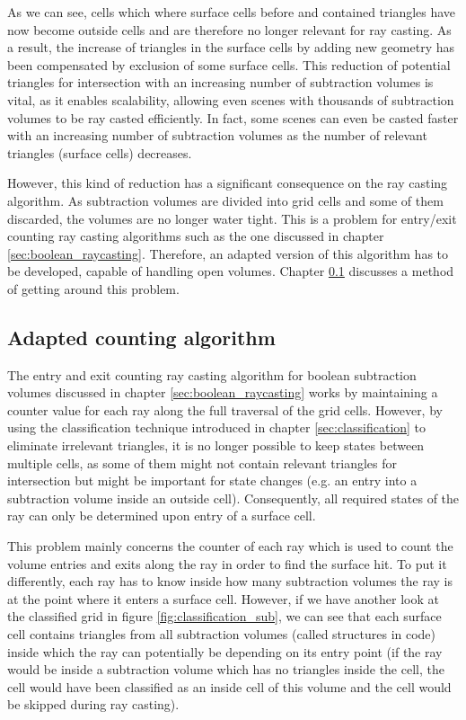 As we can see, cells which where surface cells before and contained triangles have now become outside cells and are therefore no longer relevant for ray casting. As a result, the increase of triangles in the surface cells by adding new geometry has been compensated by exclusion of some surface cells. This reduction of potential triangles for intersection with an increasing number of subtraction volumes is vital, as it enables scalability, allowing even scenes with thousands of subtraction volumes to be ray casted efficiently. In fact, some scenes can even be casted faster with an increasing number of subtraction volumes as the number of relevant triangles (surface cells) decreases.

However, this kind of reduction has a significant consequence on the ray casting algorithm. As subtraction volumes are divided into grid cells and some of them discarded, the volumes are no longer water tight. This is a problem for entry/exit counting ray casting algorithms such as the one discussed in chapter \ref{sec:boolean_raycasting}. Therefore, an adapted version of this algorithm has to be developed, capable of handling open volumes. Chapter \ref{sec:adapted_ray_casting} discusses a method of getting around this problem.


\subsection{Adapted counting algorithm}
\label{sec:adapted_ray_casting}

The entry and exit counting ray casting algorithm for boolean subtraction volumes discussed in chapter \ref{sec:boolean_raycasting} works by maintaining a counter value for each ray along the full traversal of the grid cells. However, by using the  classification technique introduced in chapter \ref{sec:classification} to eliminate irrelevant triangles, it is no longer possible to keep states between multiple cells, as some of them might not contain relevant triangles for intersection but might be important for state changes (e.g. an entry into a subtraction volume inside an outside cell). Consequently, all required states of the ray can only be determined upon entry of a surface cell.

This problem mainly concerns the counter of each ray which is used to count the volume entries and exits along the ray in order to find the surface hit. To put it differently, each ray has to know inside how many subtraction volumes the ray is at the point where it enters a surface cell. However, if we have another look at the classified grid in figure \ref{fig:classification_sub}, we can see that each surface cell contains triangles from all subtraction volumes (called structures in code) inside which the ray can potentially be depending on its entry point (if the ray would be inside a subtraction volume which has no triangles inside the cell, the cell would have been classified as an inside cell of this volume and the cell would be skipped during ray casting). 

